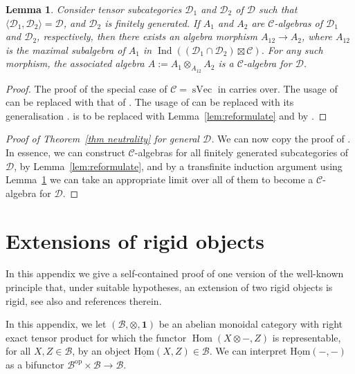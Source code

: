 \documentclass[11pt]{amsart}
\def\Ind{\operatorname{Ind}}
\def\Hom{\operatorname{Hom}}
\newcommand{\uHom}{\underline{\mathrm{Hom}}}
\def\Ds{\mathscr{D}}
\def\cC{\mathscr{C}}
\def\sVec{\operatorname{sVec}}
\def\cB{\mathscr{B}}
\newtheorem{lemma}[thm]{Lemma}
\theoremstyle{definition}
\theoremstyle{remark}
\numberwithin{equation}{section}
\newcommand{\unit}{\mathbf{1}}
\begin{document}
\begin{lemma}\label{LemSlick}
Consider tensor subcategories $\Ds_1$ and $\Ds_2$ of $\Ds$ such that $\langle\Ds_1,\Ds_2\rangle=\Ds$, and $\Ds_2$ is finitely generated. 
If $A_1$ and $A_2$ are $\cC$-algebras of $\Ds_1$ and $\Ds_2$, respectively, then there exists an algebra morphism $A_{12}\to A_2$, where $A_{12}$ is the maximal subalgebra of $A_1$ in $\Ind((\Ds_1\cap\Ds_2)\boxtimes\cC)$. For any such morphism, the associated  algebra $A:=A_1\otimes_{A_{12}}A_2$ is a $\cC$-algebra for $\Ds$.
\end{lemma}


\begin{proof}
    The proof of the special case of $\cC=\sVec$ in \cite[Lemma~6.4.3]{Duke} carries over. The usage of \cite[Corollary~6.3.3]{Duke} can be replaced with that of \cite[Corollary~4.3.4]{CEO}. The usage of \cite[Theorem~6.3.1]{Duke} can be replaced with its generalisation \cite[Theorem~4.3.1]{CEO}. \cite[Lemma~6.4.2]{Duke} is to be replaced with Lemma~\ref{lem:reformulate} and \cite[Proposition~6.3.4]{Duke} by \cite[Corollary~7.2.7]{C1}.
\end{proof}

\begin{proof}[Proof of Theorem~\ref{thm neutrality} for general $\Ds$]
    We can now copy the proof of \cite[Theorem~6.4.1]{Duke}. In essence, we can construct $\cC$-algebras for all finitely generated subcategories of $\Ds$, by Lemma~\ref{lem:reformulate}, and by a transfinite induction argument using Lemma~\ref{LemSlick} we can take an appropriate limit over all of them to become a $\cC$-algebra for $\Ds$.
\end{proof}



\section{Extensions of rigid objects}\label{App:C}

In this appendix we give a self-contained proof of one version of the well-known principle that, under suitable hypotheses, an extension of two rigid objects is rigid, see also \cite[\S 4]{EP} and references therein.


In this appendix, we let $(\cB,\otimes ,\unit)$ be an abelian
monoidal category with right exact tensor product for which the functor
$\Hom(X\otimes-,Z)$
is representable, for all $X,Z\in\cB$, by an object $\uHom(X,Z)\in\cB$. We can interpret $\uHom(-,-)$ as a bifunctor $\cB^{\mathrm{op}}\times\cB\to\cB$.
\end{document}
